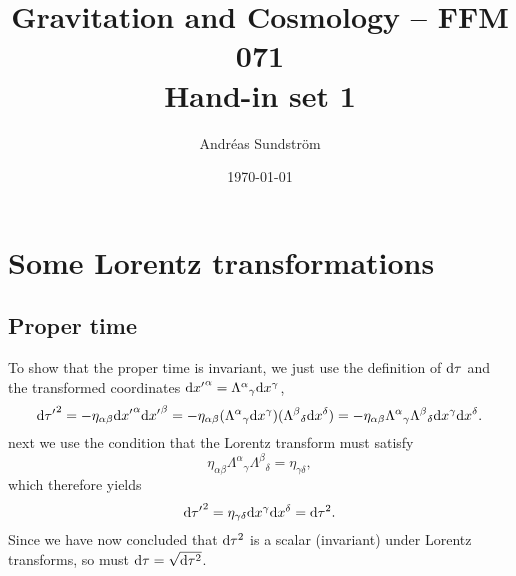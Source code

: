 \documentclass[11pt,a4paper, 
swedish, english %
]{article}
\begin{document}


%


\title{Gravitation and Cosmology -- FFM 071
\\ {\Large Hand-in set 1} }
\author{Andréas Sundström}
\date{\today}

\maketitle



\renewcommand{\thesubsection}{\arabic{section} (\alph{subsection})}
\section{Some Lorentz transformations}
\subsection{Proper time}
To show that the proper time is invariant, we just use the definition
of $\mathrm{d}\tau$ and the transformed coordinates 
$\mathrm{d}{x'}^\alpha={\Lambda^\alpha}_\gamma \mathrm{d}{x}^{\gamma}$,
\begin{equation}
\mathrm{d}{\tau'}^2=-\eta_{\alpha\beta}\mathrm{d}{x'}^{\alpha}\mathrm{d}{x'}^{\beta}
=-\eta_{\alpha\beta}({\Lambda^\alpha}_\gamma \mathrm{d}{x}^{\gamma})
({\Lambda^\beta}_\delta\mathrm{d}{x}^{\delta})
=-\eta_{\alpha\beta}{\Lambda^\alpha}_\gamma{\Lambda^\beta}_\delta
\mathrm{d}{x}^{\gamma}\mathrm{d}{x}^{\delta}.
\end{equation}
next we use the condition that the Lorentz transform must satisfy
\begin{equation}
\eta_{\alpha\beta}{\Lambda^\alpha}_\gamma{\Lambda^\beta}_\delta
=\eta_{\gamma\delta},
\end{equation}
which therefore yields
\begin{equation}
\mathrm{d}{\tau'}^2=\eta_{\gamma\delta}\mathrm{d}{x}^{\gamma}\mathrm{d}{x}^{\delta}
=\mathrm{d}\tau^2.
\end{equation}
Since we have now concluded that $\mathrm{d}\tau^2$ is a scalar (invariant)
under Lorentz transforms, so must $\mathrm{d}\tau=\sqrt{\mathrm{d}\tau^2}$.
\end{document}
